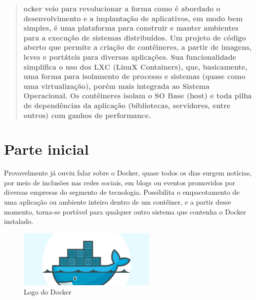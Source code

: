 \documentclass[a4paper,11pt]{article}
\begin{document}
	
\maketitle %
\thispagestyle{fancy} %

\begin{abstract}
	\textbf{ocker \cite{dockeroficial} veio para revolucionar a forma como é abordado o desenvolvimento e a implantação de aplicativos, em modo bem simples, é uma plataforma para construir e manter ambientes para a execução de sistemas distribuídos. Um projeto de código aberto que permite a criação de contêineres, a partir de imagens, leves e portáteis para diversas aplicações. Sua funcionalidade simplifica o uso dos LXC (LinuX Containers), que, basicamente, uma forma para isolamento de processo e sistemas (quase como uma virtualização), porém mais integrada ao Sistema Operacional. Os contêineres isolam o SO Base (host) e toda pilha de dependências da aplicação (bibliotecas, servidores, entre outros) com ganhos de performance.}
\end{abstract}

\section{Parte inicial}
Provavelmente já ouviu falar sobre o Docker, quase todos os dias surgem notícias, por meio de inclusões nas redes sociais, em blogs ou eventos promovidos por diversas empresas do segmento de tecnologia. Possibilita o empacotamento de uma aplicação ou ambiente inteiro dentro de um contêiner, e a partir desse momento, torna-se portável para qualquer outro sistema que contenha o Docker instalado.
\begin{figure}[H]
	\centering
	\includegraphics[width=0.6\textwidth]{imagem/DockerLogo.jpg}
	\caption{Logo do Docker}
\end{figure}
\end{document}
